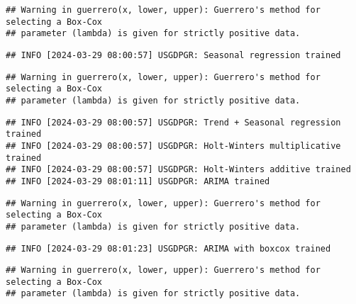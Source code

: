\documentclass[
]{article}
\begin{document}
\begin{verbatim}
## Warning in guerrero(x, lower, upper): Guerrero's method for selecting a Box-Cox
## parameter (lambda) is given for strictly positive data.
\end{verbatim}

\begin{verbatim}
## INFO [2024-03-29 08:00:57] USGDPGR: Seasonal regression trained
\end{verbatim}

\begin{verbatim}
## Warning in guerrero(x, lower, upper): Guerrero's method for selecting a Box-Cox
## parameter (lambda) is given for strictly positive data.
\end{verbatim}

\begin{verbatim}
## INFO [2024-03-29 08:00:57] USGDPGR: Trend + Seasonal regression trained
## INFO [2024-03-29 08:00:57] USGDPGR: Holt-Winters multiplicative trained
## INFO [2024-03-29 08:00:57] USGDPGR: Holt-Winters additive trained
## INFO [2024-03-29 08:01:11] USGDPGR: ARIMA trained
\end{verbatim}

\begin{verbatim}
## Warning in guerrero(x, lower, upper): Guerrero's method for selecting a Box-Cox
## parameter (lambda) is given for strictly positive data.
\end{verbatim}

\begin{verbatim}
## INFO [2024-03-29 08:01:23] USGDPGR: ARIMA with boxcox trained
\end{verbatim}

\begin{verbatim}
## Warning in guerrero(x, lower, upper): Guerrero's method for selecting a Box-Cox
## parameter (lambda) is given for strictly positive data.
\end{verbatim}
\end{document}
